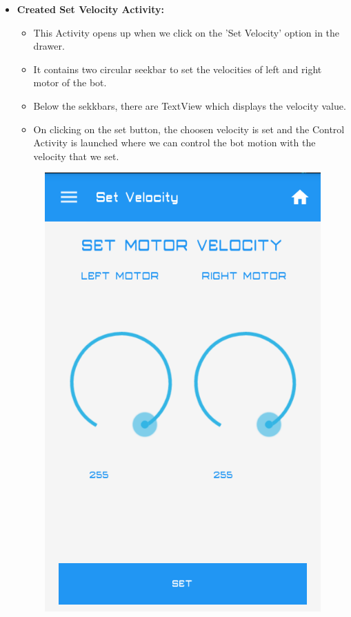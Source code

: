 \documentclass[a4paper,12pt,oneside]{book}
\begin{document}
\begin{enumerate}
\begin{itemize}
			\newpage
			\item \textbf{Created Set Velocity Activity:} 
			\begin{itemize}
			    \item This Activity opens up when we click on the 'Set Velocity' option in the drawer.
			    \item It contains two circular seekbar to set the velocities of left and right motor of the bot.
			    \item Below the sekkbars, there are TextView which displays the velocity value.
			    \item On clicking on the set button, the choosen velocity is set and the Control Activity is launched where we can control the bot motion with the velocity that we set.
			\end{itemize}
				\begin{figure}[h]
					\begin{center}
						\includegraphics[scale=0.4]{setvelocity.png}

\end{center}
\end{figure}
\end{itemize}
\end{enumerate}
\end{document}
